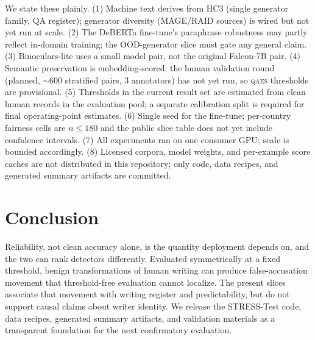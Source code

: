 \documentclass[11pt]{article}
\newcommand{\qaes}{\textsc{qaes}}
\newcommand{\stresstest}{STRESS-Test}
\begin{document}
We state these plainly. (1) Machine text derives from HC3 (single generator
family, QA register); generator diversity (MAGE/RAID sources) is wired but
not yet run at scale. (2) The DeBERTa fine-tune's paraphrase robustness may
partly reflect in-domain training; the OOD-generator slice must gate any
general claim. (3) Binoculars-lite uses a small model pair, not the original
Falcon-7B pair. (4) Semantic preservation is embedding-scored; the human
validation round (planned, $\sim$600 stratified pairs, 3 annotators) has not
yet run, so \qaes{} thresholds are provisional. (5) Thresholds in the current
result set are estimated from clean human records in the evaluation pool; a
separate calibration split is required for final operating-point estimates.
(6) Single seed for the fine-tune; per-country fairness cells are $n \leq 180$
and the public slice table does not yet include confidence intervals.
(7) All experiments ran on one consumer GPU; scale is bounded accordingly.
(8) Licensed corpora, model weights, and per-example score caches are not
distributed in this repository; only code, data recipes, and generated summary
artifacts are committed.

\section{Conclusion}
Reliability, not clean accuracy alone, is the quantity deployment depends on,
and the two can rank detectors differently. Evaluated symmetrically at a fixed
threshold, benign transformations of human writing can produce
false-accusation movement that threshold-free evaluation cannot localize. The
present slices associate that movement with writing register and predictability,
but do not support causal claims about writer identity. We release the
\stresstest{} code, data recipes, generated summary artifacts, and validation
materials as a transparent foundation for the next confirmatory evaluation.

{\small


}
\end{document}
